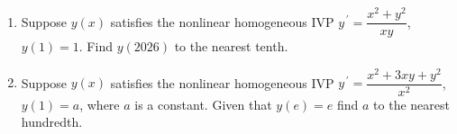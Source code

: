 \documentclass{ximera}
\begin{document}
\begin{enumerate}[label=(\arabic*)]

\item  Suppose $y(x)$ satisfies the nonlinear homogeneous IVP $\displaystyle y^{\,\prime}=\dfrac{x^2+y^2}{xy}$, $y(1)=1$.  Find $y(2026)$ to the nearest tenth.\\





\item Suppose $y(x)$ satisfies the nonlinear homogeneous IVP $\displaystyle y^{\,\prime}=\dfrac{x^2+3xy+y^2}{x^2}$, $y(1)=a$, where $a$ is a constant.  Given that $y(e)=e$ find $a$ to the nearest hundredth. \\




\end{enumerate}
\end{document}
